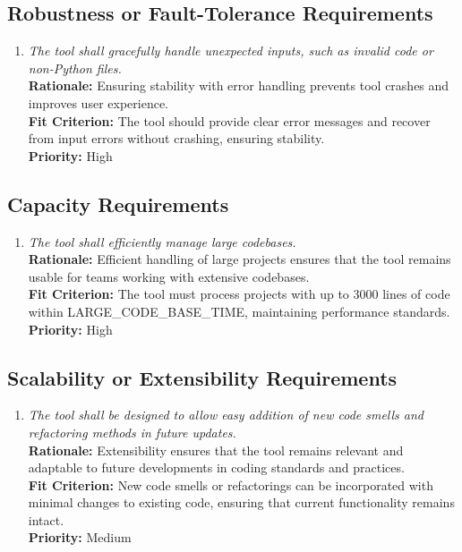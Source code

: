 \documentclass[12pt]{article}
\begin{document}
\subsection{Robustness or Fault-Tolerance Requirements}
\begin{enumerate}[label=PR-RFT \arabic*., wide=0pt, leftmargin=*]
  \item \emph{The tool shall gracefully handle unexpected inputs,
    such as invalid code or non-Python files.}\\[2mm]
    {\bf Rationale:} Ensuring stability with error handling prevents
    tool crashes and improves user experience.\\
    {\bf Fit Criterion:} The tool should provide clear error messages
    and recover from input errors without crashing, ensuring stability.\\
    {\bf Priority:} High
\end{enumerate}

\subsection{Capacity Requirements}
\begin{enumerate}[label=PR-CR \arabic*., wide=0pt, leftmargin=*]
  \item \emph{The tool shall efficiently manage large codebases.}\\[2mm]
    {\bf Rationale:} Efficient handling of large projects ensures
    that the tool remains usable for teams working with extensive codebases.\\
    {\bf Fit Criterion:} The tool must process projects with up to
    3000 lines of code within LARGE\_CODE\_BASE\_TIME, maintaining
    performance standards.\\
    {\bf Priority:} High
\end{enumerate}

\subsection{Scalability or Extensibility Requirements}
\begin{enumerate}[label=PR-SER \arabic*., wide=0pt, leftmargin=*]
  \item \emph{The tool shall be designed to allow easy addition of
    new code smells and refactoring methods in future updates.}\\[2mm]
    {\bf Rationale:} Extensibility ensures that the tool remains
    relevant and adaptable to future developments in coding standards
    and practices.\\
    {\bf Fit Criterion:} New code smells or refactorings can be
    incorporated with minimal changes to existing code, ensuring that
    current functionality remains intact.\\
    {\bf Priority:} Medium
\end{enumerate}
\end{document}
